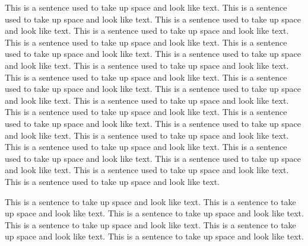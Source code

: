 \documentclass[chap,11pt,letterpaper]{rpithesis}
\begin{document}
 
\author{Anonymous Name}        



\titlepage 
\abstitlepage    
\copyrightpage  
\tableofcontents        
\listoftables          
\listoffigures   

This is a sentence used to take up space and look like text. This is a sentence used to take up space and look like text.
This is a sentence used to take up space and look like text. This is a sentence used to take up space and look like text.
This is a sentence used to take up space and look like text. This is a sentence used to take up space and look like text.
This is a sentence used to take up space and look like text. This is a sentence used to take up space and look like text.
This is a sentence used to take up space and look like text. This is a sentence used to take up space and look like text.
This is a sentence used to take up space and look like text. This is a sentence used to take up space and look like text.
This is a sentence used to take up space and look like text. This is a sentence used to take up space and look like text.
This is a sentence used to take up space and look like text. This is a sentence used to take up space and look like text.
This is a sentence used to take up space and look like text. This is a sentence used to take up space and look like text.
This is a sentence used to take up space and look like text. This is a sentence used to take up space and look like text.
This is a sentence used to take up space and look like text.

This is a sentence to take up space and look like text. This is a sentence to take up space and look like text.
This is a sentence to take up space and look like text. This is a sentence to take up space and look like text.
This is a sentence to take up space and look like text. This is a sentence to take up space and look like text.
 
\end{document}
